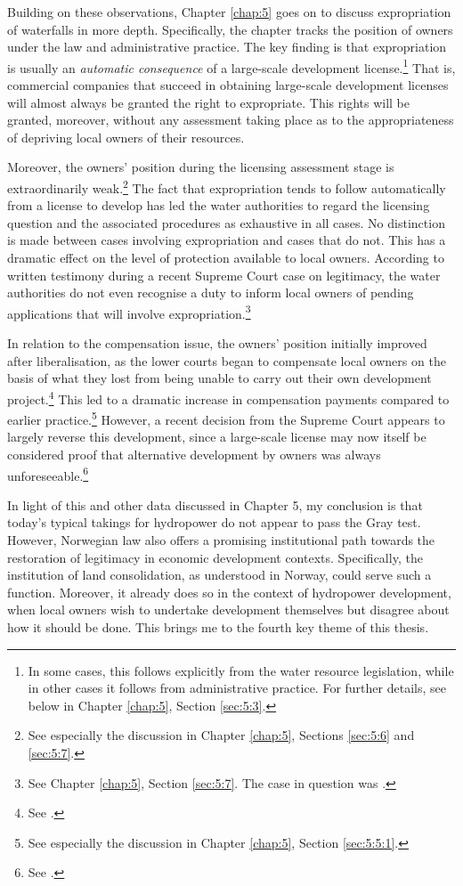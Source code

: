 Building on these observations, Chapter \ref{chap:5} goes on to discuss expropriation of waterfalls in more depth. Specifically, the chapter tracks the position of owners under the law and administrative practice. The key finding is that expropriation is usually an {\it automatic consequence} of a large-scale development license.\footnote{In some cases, this follows explicitly from the water resource legislation, while in other cases it follows from administrative practice. For further details, see below in Chapter \ref{chap:5}, Section \ref{sec:5:3}.} That is, commercial companies that succeed in obtaining large-scale development licenses will almost always be granted the right to expropriate. This rights will be granted, moreover, without any assessment taking place as to the appropriateness of depriving local owners of their resources.

Moreover, the owners' position during the licensing assessment stage is extraordinarily weak.\footnote{See especially the discussion in Chapter \ref{chap:5}, Sections \ref{sec:5:6} and \ref{sec:5:7}.} The fact that expropriation tends to follow automatically from a license to develop has led the water authorities to regard the licensing question and the associated procedures as exhaustive in all cases. No distinction is made between cases involving expropriation and cases that do not. This has a dramatic effect on the level of protection available to local owners. According to written testimony during a recent Supreme Court case on legitimacy, the water authorities do not even recognise a duty to inform local owners of pending applications that will involve expropriation.\footnote{See Chapter \ref{chap:5}, Section \ref{sec:5:7}. The case in question was \cite{jorpeland11}.}

In relation to the compensation issue, the owners' position initially improved after liberalisation, as the lower courts began to compensate local owners on the basis of what they lost from being unable to carry out their own development project.\footnote{See \cite{uleberg08}.} This led to a dramatic increase in compensation payments compared to earlier practice.\footnote{See especially the discussion in Chapter \ref{chap:5}, Section \ref{sec:5:5:1}.} However, a recent decision from the Supreme Court appears to largely reverse this development, since a large-scale license may now itself be considered proof that alternative development by owners was always unforeseeable.\footnote{See \cite{otra13}.}

In light of this and other data discussed in Chapter 5, my conclusion is that today's typical takings for hydropower do not appear to pass the Gray test. However, Norwegian law also offers a promising institutional path towards the restoration of legitimacy in economic development contexts. Specifically, the institution of land consolidation, as understood in Norway, could serve such a function. Moreover, it already does so in the context of hydropower development, when local owners wish to undertake development themselves but disagree about how it should be done. This brings me to the fourth key theme of this thesis.

